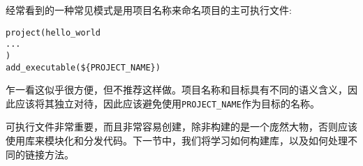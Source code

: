 经常看到的一种常见模式是用项目名称来命名项目的主可执行文件:

\begin{lstlisting}[style=styleCMake]
project(hello_world
...
)
add_executable(${PROJECT_NAME})
\end{lstlisting}

乍一看这似乎很方便，但不推荐这样做。项目名称和目标具有不同的语义含义，因此应该将其独立对待，因此应该避免使用\texttt{PROJECT\_NAME}作为目标的名称。

可执行文件非常重要，而且非常容易创建，除非构建的是一个庞然大物，否则应该使用库来模块化和分发代码。下一节中，我们将学习如何构建库，以及如何处理不同的链接方法。





























